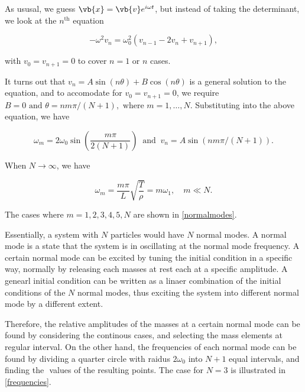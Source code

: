 \documentclass[a4paper,12pt]{report}
\begin{document}
As ususal, we guess \(\vb{x} = \vb{v} e^{i \omega t} \), but instead of taking the determinant, we look at the \(n^{\text{th}} \) equation

\begin{equation}
	-\omega ^2 v_{n} = \omega _{0}^2(v_{n-1} -2v_{n} +v_{n+1} ),
\end{equation}

with \(v_{0} = v_{n+1} =0 \) to cover \(n=1 \text { or } n\) cases.  

It turns out that \(v_{n} = A \sin (n \theta ) + B\cos (n \theta ) \) is a general solution to the equation, and to accomodate for \(v_{0} = v_{n+1} = 0  \), we require \(B = 0 \text { and }  \theta = nm\pi /(N+1), \text{ where } m = 1,\ldots , N \). Substituting into the above equation, we have

\begin{equation}
	\omega_{m}  = 2 \omega _{0}\sin \left( \frac{m\pi }{2(N+1)}  \right) ~\text { and }~ v_{n} = A \sin \left( nm\pi /(N+1)  \right). \label{normalmode} 
\end{equation}

When \(N \to \infty\), we have 

\begin{equation}
	\omega _{m} =  \frac{m\pi }{L} \sqrt{\frac{T}{\rho } } = m \omega _{1} , \quad m \ll N.
\end{equation}

The cases where \(m = 1,2,3,4,5,N\) are shown in \cref{normalmodes}. 


Essentially, a system with \(N\) particles would have \(N\) normal modes. A normal mode is a state that the system is in oscillating at the normal mode frequency. A certain normal mode can be excited by tuning the initial condition in a specific way, normally by releasing each masses at rest each at a specific amplitude. A genearl initial condition can be written as a linaer combination of the initial conditions of the \(N\) normal modes, thus exciting the system into different normal mode by a different extent. 

Therefore, the relative amplitudes of the masses at a certain normal mode can be found by considering the continous cases, and selecting the mass elements at regular interval. On the other hand, the frequencies of each normal mode can be found by dividing a quarter circle with raidus \(2 \omega _{0} \) into \(N+1\) equal intervals, and finding the \(\) values of the resulting points. The case for \(N=3\) is illustrated in \cref{frequencies}.
\end{document}
